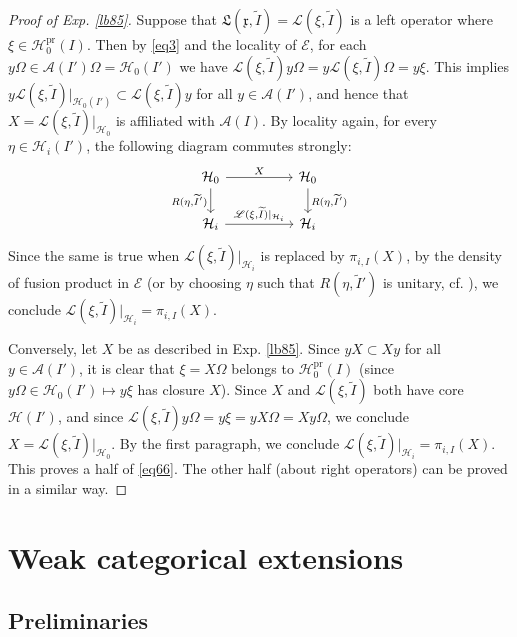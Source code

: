 \documentclass[11pt,b5paper,notitlepage]{article}
\theoremstyle{definition}
\theoremstyle{plain}
\newcommand{\fk}{\mathfrak}
\newcommand{\mc}{\mathcal}
\newcommand{\wtd}{\widetilde}
\newcommand{\scr}{\mathscr}
\newcommand{\xk}{\mathfrak x}
\newcommand{\pr}{\mathrm {pr}}
\numberwithin{equation}{section}
\begin{document}
\begin{proof}[Proof of Exp. \ref{lb85}]
Suppose that $\fk L(\xk,\wtd I)=\scr L(\xi,\wtd I)$ is a left operator where $\xi\in\mc H_0^\pr(I)$. Then by \eqref{eq3} and the locality of $\scr E$, for each $y\Omega\in\mc A(I')\Omega=\mc H_0(I')$ we have $\scr L(\xi,\wtd I)y\Omega=y\scr L(\xi,\wtd I)\Omega=y\xi$. This implies $y\scr L(\xi,\wtd I)|_{\mc H_0(I')}\subset\scr L(\xi,\wtd I)y$ for all $y\in\mc A(I')$, and hence that $X=\scr L(\xi,\wtd I)|_{\mc H_0}$ is affiliated with $\mc A(I)$. By locality again, for every $\eta\in\mc H_i(I')$, the following diagram commutes strongly:
\begin{equation*}
\begin{tikzcd}[column sep=huge]
\mc H_0 \arrow[r,"X"] \arrow[d,"{R(\eta,\wtd I')}"'] & \mc H_0 \arrow[d,"{R(\eta,\wtd I')}"] \\
\mc H_i  \arrow[r,"{\scr L(\xi,\wtd I)|_{\mc H_i}}"]           & \mc H_i       
\end{tikzcd}
\end{equation*}
Since the same is true when $\scr L(\xi,\wtd I)|_{\mc H_i}$ is replaced by $\pi_{i,I}(X)$, by the density of fusion product in $\scr E$ (or by choosing $\eta$ such that $R(\eta,\wtd I')$ is unitary, cf. \cite[Lem. 6.1]{Gui21a}), we conclude $\scr L(\xi,\wtd I)|_{\mc H_i}=\pi_{i,I}(X)$.

Conversely, let $X$ be as described in Exp. \ref{lb85}. Since $yX\subset Xy$ for all $y\in\mc A(I')$, it is clear that $\xi=X\Omega$ belongs to $\mc H_0^\pr(I)$ (since $y\Omega\in\mc H_0(I')\mapsto y\xi$ has closure $X$). Since $X$ and $\scr L(\xi,\wtd I)$ both have core $\mc H(I')$, and since $\scr L(\xi,\wtd I)y\Omega=y\xi=yX\Omega=Xy\Omega$, we conclude $X=\scr L(\xi,\wtd I)|_{\mc H_0}$. By the first paragraph, we conclude $\scr L(\xi,\wtd I)|_{\mc H_i}=\pi_{i,I}(X)$. This proves a half of \eqref{eq66}. The other half (about right operators) can be proved in a similar way.
\end{proof}







\section{Weak categorical extensions}


\subsection{Preliminaries}
\end{document}
